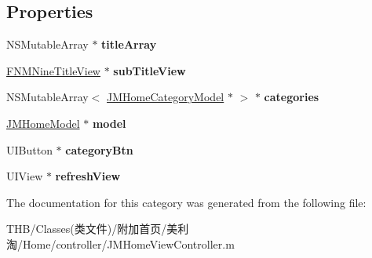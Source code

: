 \subsection*{Properties}
\begin{DoxyCompactItemize}
\item 
\mbox{\label{category_j_m_home_view_controller_07_08_a1668358421ac386c283d490b227b595f}} 
N\+S\+Mutable\+Array $\ast$ {\bfseries title\+Array}
\item 
\mbox{\label{category_j_m_home_view_controller_07_08_a410f8d33267a19fdbd8c6904fcec2c60}} 
\mbox{\hyperlink{interface_f_n_m_nine_title_view}{F\+N\+M\+Nine\+Title\+View}} $\ast$ {\bfseries sub\+Title\+View}
\item 
\mbox{\label{category_j_m_home_view_controller_07_08_ac0b075c8b3cdc97861c3280df1e7a40b}} 
N\+S\+Mutable\+Array$<$ \mbox{\hyperlink{interface_j_m_home_category_model}{J\+M\+Home\+Category\+Model}} $\ast$ $>$ $\ast$ {\bfseries categories}
\item 
\mbox{\label{category_j_m_home_view_controller_07_08_a52ed8b4428eede7382375d1b1229161e}} 
\mbox{\hyperlink{interface_j_m_home_model}{J\+M\+Home\+Model}} $\ast$ {\bfseries model}
\item 
\mbox{\label{category_j_m_home_view_controller_07_08_abdd78452cb0d78b7ed9a41733ff663a2}} 
U\+I\+Button $\ast$ {\bfseries category\+Btn}
\item 
\mbox{\label{category_j_m_home_view_controller_07_08_a50e945f1942bc72bea063d188a156f44}} 
U\+I\+View $\ast$ {\bfseries refresh\+View}
\end{DoxyCompactItemize}


The documentation for this category was generated from the following file\+:\begin{DoxyCompactItemize}
\item 
T\+H\+B/\+Classes(类文件)/附加首页/美利淘/\+Home/controller/J\+M\+Home\+View\+Controller.\+m\end{DoxyCompactItemize}
